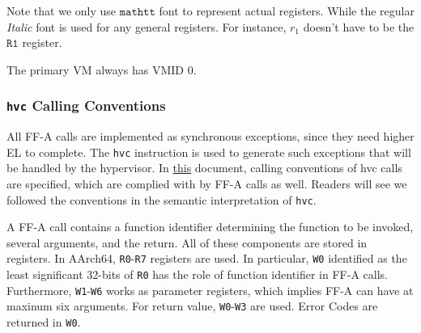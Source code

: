 \documentclass[a4paper]{article}
\newcommand*{\VMID}{\text{VMID}}
\newcommand*{\instr}[1]{\texttt{#1}}
\begin{document}
Note that we only use $\mathtt{mathtt}$ font to represent actual registers.
While the regular \emph{Italic} font is used for any general registers. For
instance, $r_{1}$ doesn't have to be the $\mathtt{R1}$ register.

The primary VM always has $\VMID$ 0.

\newcommand{\reg}[1]{\texttt{{#1}}}

\subsubsection{\instr{hvc} Calling Conventions}
All FF-A calls are implemented as synchronous exceptions, since they need higher
EL to complete. The \instr{hvc} instruction is used to generate such exceptions
that will be handled by the hypervisor. In
\href{https://developer.arm.com/documentation/den0028/latest}{this} document,
calling conventions of hvc calls are specified, which are complied with by FF-A
calls as well. Readers will see we followed the conventions in the semantic
interpretation of \instr{hvc}.


A FF-A call contains a function identifier determining the function to be
invoked, several arguments, and the return. All of these components are stored
in registers. In AArch64, \reg{R0}-\reg{R7} registers are used. In particular,
\reg{W0} identified as the least significant 32-bits of \reg{R0} has the role of
function identifier in FF-A calls. Furthermore, \reg{W1}-\reg{W6} works as
parameter registers, which implies FF-A can have at maxinum six arguments. For
return value, \reg{W0}-\reg{W3} are used. Error Codes are returned in \reg{W0}.
\end{document}

